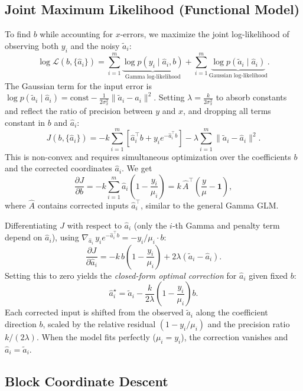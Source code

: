 \documentclass{article}
\begin{document}
\subsection{Joint Maximum Likelihood (Functional Model)}
To find $b$ while accounting for $x$-errors, we maximize the joint log-likelihood of observing both $y_i$ and the noisy $\tilde{a}_i$:
\[
    \log \mathcal{L}(b, \{\hat{a}_i\}) = \sum_{i=1}^m \underbrace{\log p(y_i \mid \hat{a}_i, b)}_{\text{Gamma log-likelihood}} + \sum_{i=1}^m \underbrace{\log p(\tilde{a}_i \mid \hat{a}_i)}_{\text{Gaussian log-likelihood}}.
\]
The Gaussian term for the input error is $\log p(\tilde{a}_i \mid \hat{a}_i) = \mathrm{const} - \frac{1}{2\sigma_x^2}\|\tilde{a}_i - \hat{a}_i\|^2$. Setting $\lambda = \frac{k}{2\sigma_x^2}$ to absorb constants and reflect the ratio of precision between $y$ and $x$, and dropping all terms constant in $b$ and $\hat{a}_i$:
\[
    J(b, \{\hat{a}_i\}) = -k \sum_{i=1}^m \left[ \hat{a}_i^\top b + y_i e^{-\hat{a}_i^\top b} \right] - \lambda \sum_{i=1}^m \| \tilde{a}_i - \hat{a}_i \|^2.
\]
This is non-convex and requires simultaneous optimization over the coefficients $b$ and the corrected coordinates $\hat{a}_i$. We get
\[
    \frac{\partial J}{\partial b}
    = -k \sum_{i=1}^m \hat{a}_i\!\left(1 - \frac{y_i}{\mu_i}\right)
    = k\,\hat{A}^\top\!\left(\frac{y}{\mu} - \mathbf{1}\right),
\]
where $\hat{A}$ contains corrected inputs $\hat{a}_i^\top$, similar to the general Gamma GLM.

\noindent Differentiating $J$ with respect to $\hat{a}_i$ (only the $i$-th Gamma and penalty term depend on $\hat{a}_i$), using $\nabla_{\hat{a}_i}\,y_i e^{-\hat{a}_i^\top b} = -y_i/\mu_i \cdot b$:
\[
    \frac{\partial J}{\partial \hat{a}_i}
    = -k\,b\!\left(1 - \frac{y_i}{\mu_i}\right) + 2\lambda(\tilde{a}_i - \hat{a}_i).
\]
Setting this to zero yields the \emph{closed-form optimal correction} for $\hat{a}_i$ given fixed $b$:
\[
    \hat{a}_i^\star = \tilde{a}_i - \frac{k}{2\lambda}\!\left(1 - \frac{y_i}{\mu_i}\right) b.
\]
Each corrected input is shifted from the observed $\tilde{a}_i$ along the coefficient direction $b$, scaled by the relative residual $(1 - y_i/\mu_i)$ and the precision ratio $k/(2\lambda)$. When the model fits perfectly ($\mu_i = y_i$), the correction vanishes and $\hat{a}_i = \tilde{a}_i$.

\subsection{Block Coordinate Descent}
\end{document}
